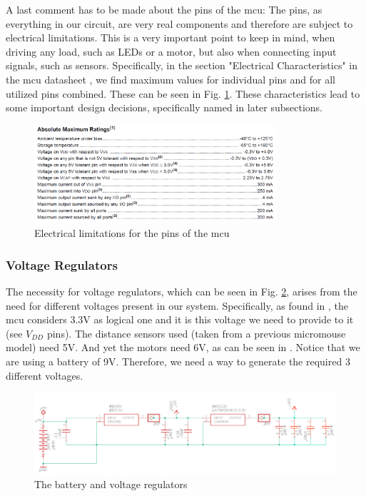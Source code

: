 A last comment has to be made about the pins of the mcu: The pins, as everything in our circuit, are very real components and therefore are subject to electrical limitations. This is a very important point to keep in mind, when driving any load, such as LEDs or a motor, but also when connecting input signals, such as sensors.
Specifically, in the section "Electrical Characteristics" in the mcu datasheet \cite{mcu}, we find maximum values for individual pins and for all utilized pins combined. These can be seen in Fig. \ref{fig:electrical}. These characteristics lead to some important design decisions, specifically named in later subsections.

\begin{figure}[htb]
    \centering
    \includegraphics[width=0.8\textwidth]{figures/hardware/Electrical.PNG}
    \caption{Electrical limitations for the pins of the mcu}
    \label{fig:electrical}
\end{figure}

\FloatBarrier
\vspace{1cm}

\subsubsection{Voltage Regulators}

The necessity for voltage regulators, which can be seen in Fig. \ref{fig:battery}, arises from the need for different voltages present in our system. 
Specifically, as found in \cite{mcu}, the mcu considers 3.3V as logical one and it is this voltage we need to provide to it (see $V_{DD}$ pins). The distance sensors used (taken from a previous micromouse model) need 5V. And yet the motors need 6V, as can be seen in \cite{motor}. 
Notice that we are using a battery of 9V. Therefore, we need a way to generate the required 3 different voltages.

\begin{figure}[htb]
    \centering
    \includegraphics[width=1\textwidth]{figures/hardware/VoltageandCapacitors.PNG}
    \caption{The battery and voltage regulators}
    \label{fig:battery}
\end{figure}

